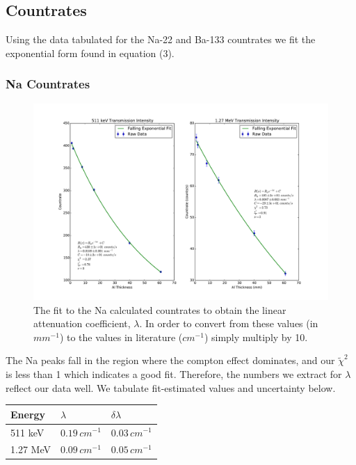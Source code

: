 \documentclass{article}
\newenvironment{tightcenter}{%
  \setlength\topsep{0pt}
  \setlength\parskip{0pt}
  \begin{center}
}{%
  \end{center}
}
\newcommand{\redchi}{$\tilde{\chi}^2\,$}
\begin{document}
	\subsection{Countrates}

	Using the data tabulated for the Na-22 and Ba-133 countrates we fit the exponential form found in equation (3).

	\subsubsection{Na Countrates}

	\begin{tightcenter}
	\begin{figure}[!htb]
		\centering
		\includegraphics[scale=.5]{../plots/countrates_Na.pdf}
		\caption{The fit to the Na calculated countrates to obtain the linear attenuation coefficient, $\lambda$.  In order to convert from these values (in $mm^{-1}$) to the values in literature ($cm^{-1}$) simply multiply by 10.}
	\end{figure}
	\end{tightcenter}

	\begin{flushleft}
	The Na peaks fall in the region where the compton effect dominates, and our \redchi is less than 1 which indicates a good fit.  Therefore, the numbers we extract for $\lambda$ reflect our data well.  We tabulate fit-estimated values and uncertainty below.
	\end{flushleft}

	\begin{center}
	\begin{tabular}{|l|l|l|}
		\hline
		Energy & $\lambda$ & $\delta \lambda$\\ \hline
		511 keV & $0.19 \, cm^{-1}$ & $0.03 \, cm^{-1}$\\
		1.27 MeV & $0.09  \, cm^{-1}$ & $0.05 \, cm^{-1}$\\
		\hline
	\end{tabular}
	\end{center}
\end{document}

